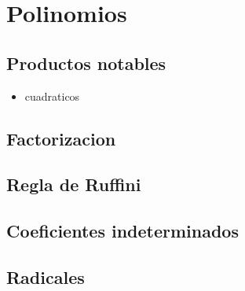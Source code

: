 
\section{Polinomios}

\subsection{Productos notables}\label{producto-notable}

\begin{itemize}
\item cuadraticos
\end{itemize}

\subsection{Factorizacion}\label{Factorización}
\subsection{Regla de Ruffini}
\subsection{Coeficientes indeterminados}
\subsection{Radicales}

